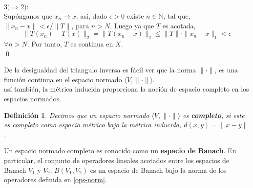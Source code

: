 \documentclass[12pt]{book}
\numberwithin{equation}{chapter}
\newtheorem{definition}[theorem]{Definici\'on}
\def\n{\noindent}
\def\la{\langle}
\def\ra{\rangle}
\def\rar{\rightarrow}
\begin{document}
\n $ 3) \Rightarrow 2) : $\\
Sup\'onganos que $ x_{n} \rar x $. as\'i, dado $\epsilon > 0 $ existe $n \in \mathbb{N}$, tal que, $ \| x_{n}-x \| < \epsilon/\|T\| $, para $ n > N $. Luego ya que $T$ es acotada,
$$ \| T(x_{n})-T(x) \|_{2}= \| T(x_{n}-x) \|_{2} \leq \|T\|\cdot \|x_{n}-x\|_{1} < \epsilon$$
$ \forall n > N $. Por tanto, $T$ es continua en $X$. \\ \qed

\vspace{5 mm}

De la desigualdad del triangulo inversa es f\'acil ver que la norma $\| \cdot \|$, es una funci\'on continua en el espacio normado $\la V, \| \cdot \| \ra$.\\

as\'i tambi\'en, la m\'etrica inducida proporciona la noci\'on de espacio completo en los espacios normados.\\

\begin{definition}
Decimos que un espacio normado $\la V, \| \cdot \| \ra$ es {\bf completo}, si este es completo como espacio m\'etrico bajo la m\'etrica inducida, $d(x,y)=\| x-y \|$.
\end{definition}

\n Un espacio normado completo es conocido como un {\bf espacio de Banach}. En particular, el conjunto de operadores lineales acotados entre los espacios de Banach $V_{1}$ y $V_{2}$, $B(V_{1},V_{2})$ es un espacio de Banach bajo la norma de los operadores definida en \eqref{ops-norm}.\\
\end{document}
